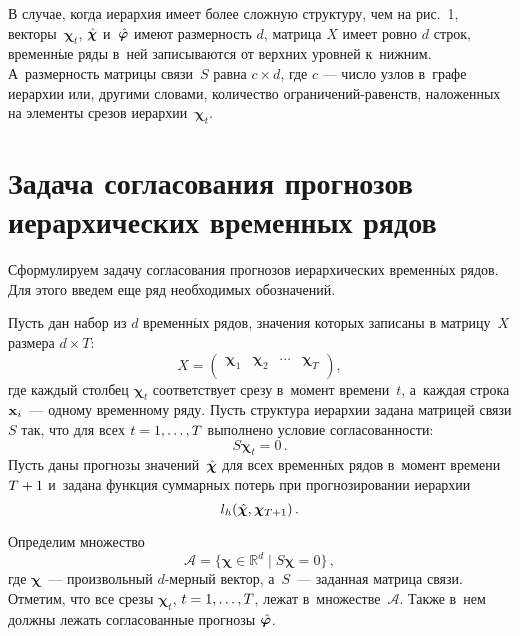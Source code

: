 \begin{multicols}{2}
В случае, когда иерархия имеет более сложную структуру, чем на
рис.~1, векторы~$\boldsymbol{\chi}_t$,
$\hat{\boldsymbol{\chi}}$ и~$\hat{\boldsymbol{\varphi}}$ имеют размерность $d$, матрица $X$ имеет ровно
$d$ строк, временн$\acute{\mbox{ы}}$е ряды в~ней записываются
от верхних уровней к~нижним. А~размерность матрицы связи~$S$ равна $c \times d$, где
$c$ --- число узлов в~графе иерархии или, другими словами,
количество огра\-ни\-че\-ний-ра\-венств, наложенных на элементы срезов
иерархии~$\boldsymbol{\chi}_t$.



\section{Задача согласования прогнозов иерархических временных рядов}

Сформулируем задачу согласования прогнозов иерархических временн$\acute{\mbox{ы}}$х
рядов. Для этого введем еще ряд необходимых обозначений.

Пусть дан набор из $d$ временн$\acute{\mbox{ы}}$х рядов, значения которых записаны
в матрицу~$X$ размера $d \times T$:
$$
    X = \left(%
\begin{array}{cccc}
  \boldsymbol{\chi}_1 & \boldsymbol{\chi}_2 & \cdots & \boldsymbol{\chi}_T \\
\end{array}%
\right),
$$
где каждый столбец $\boldsymbol{\chi}_t$ соответствует срезу в~момент времени~$t$, а~каждая строка $\mathbf{x}_i$~--- одному
временному ряду. Пусть структура иерархии задана матрицей связи $S$ так, что
для всех $t \hm= 1, \ldots ,T$ выполнено условие согласованности:
$$
    S \boldsymbol{\chi}_t = 0\,.
$$
Пусть даны прогнозы  значений~$\hat{\boldsymbol{\chi}}$ для всех временн$\acute{\mbox{ы}}$х рядов в~момент
времени $T\hm + 1$ и~задана функция суммарных потерь при
прогнозировании иерархии
\begin{equation}
\label{eq:HierarchyLoss}
    l_h(\hat{\boldsymbol{\chi}}, \boldsymbol{\chi}_{T+1})\,.
\end{equation}

Определим множество
\begin{equation}
\label{eq:SetReconciled}
    \mathcal{A} = \{ \boldsymbol{\chi} \in \mathbb{R}^d \mid S \boldsymbol{\chi} = 0 \}\,,
\end{equation}
где $\boldsymbol{\chi}$~--- произвольный $d$-мерный вектор, а~$S$~--- заданная матрица связи. Отметим, что все срезы $\boldsymbol{\chi}_t$, $t \hm=
1, \ldots, T$, лежат в~множестве~$\mathcal{A}$. Также в~нем должны лежать
согласованные прогнозы $\hat{\boldsymbol{\varphi}}$.


\end{multicols}
